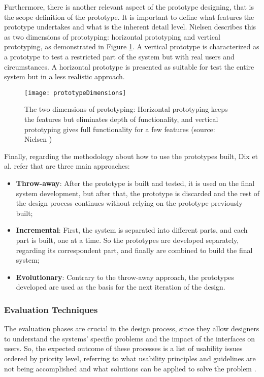Furthermore, there is another relevant aspect of the prototype designing, that is the scope definition of the prototype. It is important to define what features the prototype undertakes and what is the inherent detail level. Nielsen \cite{usabilityEngineering} describes this as two dimensions of prototyping: horizontal prototyping and vertical prototyping, as demonstrated in Figure \ref{fig:prototypeDimensions}. 
A vertical prototype is characterized as a prototype to test a restricted part of the system but with real users and circumstances. A horizontal prototype is presented as suitable for test the entire system but in a less realistic approach.

\begin{figure}[htbp]
	\centering
	\texttt{[image: prototypeDimensions]}
	\caption{The two dimensions of prototyping: Horizontal prototyping keeps the features but eliminates depth of functionality, and vertical prototyping gives full functionality for a few features (source: Nielsen \cite{usabilityEngineering})}
	\label{fig:prototypeDimensions}
\end{figure}

Finally, regarding the methodology about how to use the prototypes built, Dix et al. \cite{humanComputerInteraction} refer that are three main approaches:

\begin{itemize}
	\item \textbf{Throw-away}: After the prototype is built and tested, it is used on the final system development, but after that, the prototype is discarded and the rest of the design process continues without relying on the prototype previously built;
	\item \textbf{Incremental}: First, the system is separated into different parts, and each part is built, one at a time. So the prototypes are developed separately, regarding its correspondent part, and finally are combined to build the final system;
	\item \textbf{Evolutionary}: Contrary to the throw-away approach, the prototypes developed are used as the basis for the next iteration of the design.
\end{itemize}



\subsubsection{Evaluation Techniques}
\label{subsubsec:user_and_task_analysis}
The evaluation phases are crucial in the design process, since they allow designers to understand the systems' specific problems and the impact of the interfaces on users. So, the expected outcome of these processes is a list of usability issues ordered by priority level, referring to what usability principles and guidelines are not being accomplished and what solutions can be applied to solve the problem \cite{usabilityEngineering}.  

